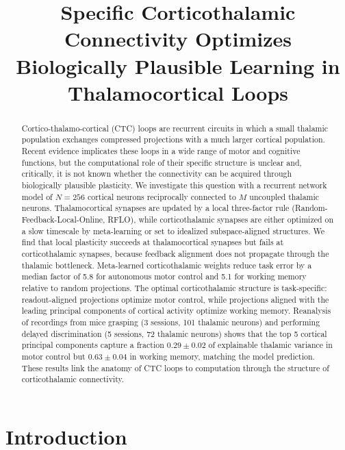 \documentclass[11pt]{article}
\title{Specific Corticothalamic Connectivity Optimizes Biologically
Plausible Learning in Thalamocortical Loops}
\date{}
\begin{document}
\maketitle

\begin{abstract}
Cortico-thalamo-cortical (CTC) loops are recurrent circuits in which a
small thalamic population exchanges compressed projections with a much
larger cortical population. Recent evidence implicates these loops in a
wide range of motor and cognitive functions, but the computational role
of their specific structure is unclear and, critically, it is not known
whether the connectivity can be acquired through biologically plausible
plasticity. We investigate this question with a recurrent network model
of $N = 256$ cortical neurons reciprocally connected to $M$ uncoupled
thalamic neurons. Thalamocortical synapses are updated by a local
three-factor rule (Random-Feedback-Local-Online, RFLO), while
corticothalamic synapses are either optimized on a slow timescale by
meta-learning or set to idealized subspace-aligned structures. We find
that local plasticity succeeds at thalamocortical synapses but fails at
corticothalamic synapses, because feedback alignment does not propagate
through the thalamic bottleneck. Meta-learned corticothalamic weights
reduce task error by a median factor of 5.8 for autonomous motor
control and 5.1 for working memory relative to random projections. The
optimal corticothalamic structure is task-specific: readout-aligned
projections optimize motor control, while projections aligned with the
leading principal components of cortical activity optimize working
memory. Reanalysis of recordings from mice grasping (3 sessions, 101
thalamic neurons) and performing delayed discrimination (5 sessions,
72 thalamic neurons) shows that the top 5 cortical principal
components capture a fraction $0.29 \pm 0.02$ of explainable thalamic
variance in motor control but $0.63 \pm 0.04$ in working memory,
matching the model prediction. These results link the anatomy of CTC
loops to computation through the structure of corticothalamic
connectivity.
\end{abstract}

\section{Introduction}
\end{document}
